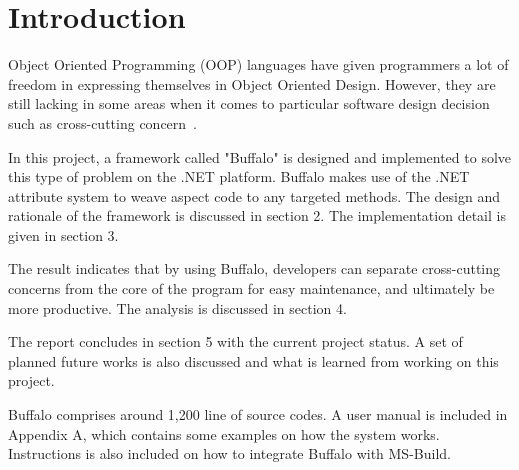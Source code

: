 \chapter{Introduction}

Object Oriented Programming (OOP) languages have given programmers a lot of freedom in expressing themselves in Object Oriented Design. However, they are still lacking in some areas when it comes to particular software design decision such as cross-cutting concern~\cite{aop}.

In this project, a framework called "Buffalo" is designed and implemented to solve this type of problem on the .NET platform. Buffalo makes use of the .NET attribute system to weave aspect code to any targeted methods. The design and rationale of the framework is discussed in section 2. The implementation detail is given in section 3.

The result indicates that by using Buffalo, developers can separate cross-cutting concerns from the core of the program for easy maintenance, and ultimately be more productive. The analysis is discussed in section 4.

The report concludes in section 5 with the current project status. A set of planned future works is also discussed and what is learned from working on this project.

Buffalo comprises around 1,200 line of source codes. A user manual is included in Appendix A, which contains some examples on how the system works. Instructions is also included on how to integrate Buffalo with MS-Build.
